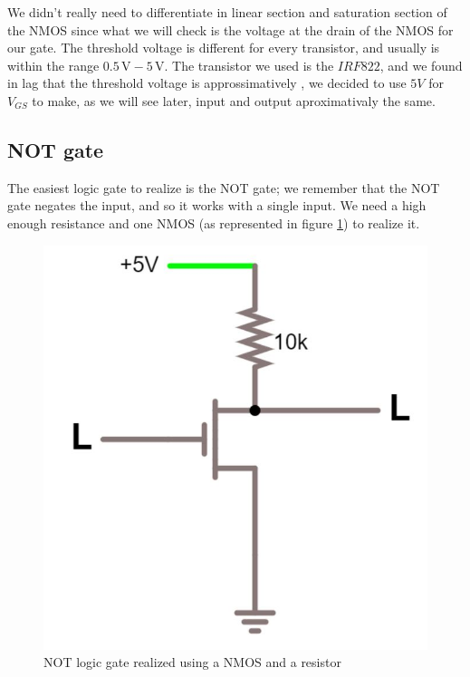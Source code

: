 \documentclass{article}
\begin{document}
\vspace{3mm}

We didn't really need to differentiate in linear section and saturation section of the NMOS since what we will check is the voltage at the drain of the NMOS for our gate. The threshold voltage is different for every transistor, and usually is within the range $0.5\,\textrm{V} - 5\,\textrm{V}$. The transistor we used is the $IRF822$, and we found in lag that the threshold voltage is approssimatively %
, we decided to use $5V$ for $V_{GS}$ to make, as we will see later, input and output aproximativaly the same.



\subsection{NOT gate}

The easiest logic gate to realize is the NOT gate; we remember that the NOT gate negates the input, and so it works with a single input. We need a high enough resistance and one NMOS (as represented in figure \ref{NOT_NMOS}) to realize it.

\begin{figure}[h]
    \centering
    \includegraphics[scale=0.3]{IM_NOT_NMOS.JPG}
    \caption{NOT logic gate realized using a NMOS and a resistor}
    \label{NOT_NMOS}
\end{figure}
\end{document}
